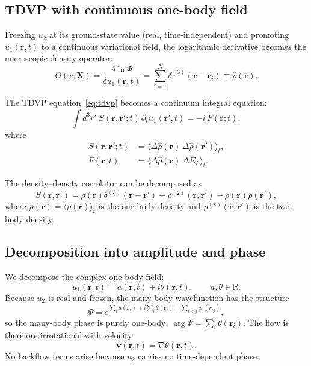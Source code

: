 \documentclass[aps,prl,onecolumn,superscriptaddress,longbibliography,nofootinbib]{revtex4-2}
\newcommand{\br}{\mathbf{r}}
\newcommand{\bv}{\mathbf{v}}
\newcommand{\bx}{\mathbf{X}}
\newcommand{\avg}[1]{\langle #1 \rangle}
\begin{document}
\subsection{TDVP with continuous one-body field}

Freezing $u_2$ at its ground-state value (real, time-independent) and
promoting $u_1(\br,t)$ to a continuous variational field, the
logarithmic derivative becomes the microscopic density operator:
\begin{equation}
O(\br;\bx) = \frac{\delta\ln\Psi}{\delta u_1(\br,t)}
= \sum_{i=1}^N\delta^{(3)}(\br-\br_i) \equiv \hat\rho(\br).
\end{equation}

The TDVP equation~\eqref{eq:tdvp} becomes a continuum integral equation:
\begin{equation}
\int d^3r'\;S(\br,\br';t)\,\partial_t u_1(\br',t) = -i\,F(\br;t),
\label{eq:tdvp_cont}
\end{equation}
where
\begin{align}
S(\br,\br';t) &= \avg{\Delta\hat\rho(\br)\,\Delta\hat\rho(\br')}_t,\\
F(\br;t) &= \avg{\Delta\hat\rho(\br)\,\Delta E_L}_t.
\end{align}

The density--density correlator can be decomposed as
\begin{equation}
S(\br,\br') = \rho(\br)\delta^{(3)}(\br-\br')
+ \rho^{(2)}(\br,\br') - \rho(\br)\rho(\br'),
\end{equation}
where $\rho(\br)=\avg{\hat\rho(\br)}_t$ is the one-body density and
$\rho^{(2)}(\br,\br')$ is the two-body density.

\subsection{Decomposition into amplitude and phase}

We decompose the complex one-body field:
\begin{equation}
u_1(\br,t) = a(\br,t) + i\theta(\br,t), \qquad a,\theta\in\mathbb{R}.
\end{equation}
Because $u_2$ is real and frozen, the many-body wavefunction has the
structure
\begin{equation}
\Psi = e^{\sum_i a(\br_i) + i\sum_i\theta(\br_i)
+ \sum_{i<j}u_2(r_{ij})},
\end{equation}
so the many-body phase is purely one-body: $\arg\Psi = \sum_i
\theta(\br_i)$.  The flow is therefore irrotational with velocity
\begin{equation}
\bv(\br,t) = \nabla\theta(\br,t).
\end{equation}
No backflow terms arise because $u_2$ carries no time-dependent phase.
\end{document}
